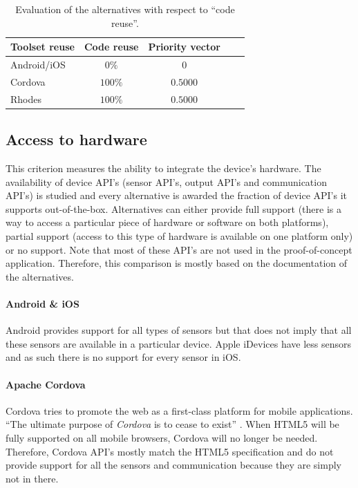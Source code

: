 \begin{table}[h!]
    \begin{center}
        \begin{tabular}{lcccl}
            \hline
            \textbf{Toolset reuse} & Code reuse & Priority vector \\
            \hline
            Android/iOS            & $0\%$       & $0$            \\
            Cordova                & $100\%$     & $0.5000$       \\
            Rhodes                 & $100\%$     & $0.5000$       \\
            \hline
        \end{tabular}
        \caption{Evaluation of the alternatives with respect to ``code reuse''.}
        \label{tab:cr}
    \end{center}
\end{table}

\subsection{Access to hardware}

This criterion measures the ability to integrate the device's hardware. The availability of device API's (sensor API's, output API's and communication API's) is studied and every alternative is awarded the fraction of device API's it supports out-of-the-box. Alternatives can either provide full support (there is a way to access a particular piece of hardware or software on both platforms), partial support (access to this type of hardware is available on one platform only) or no support. Note that most of these API's are not used in the proof-of-concept application. Therefore, this comparison is mostly based on the documentation of the alternatives.

\paragraph{Android \& iOS} Android provides support for all types of sensors but that does not imply that all these sensors are available in a particular device. Apple iDevices have less sensors and as such there is no support for every sensor in iOS.

\paragraph{Apache Cordova} Cordova tries to promote the web as a first-class platform for mobile applications. ``The ultimate purpose of \emph{Cordova} is to cease to exist'' \cite{LeRoux:2012}. When HTML5 will be fully supported on all mobile browsers, Cordova will no longer be needed. Therefore, Cordova API's mostly match the HTML5 specification and do not provide support for all the sensors and communication because they are simply not in there.

